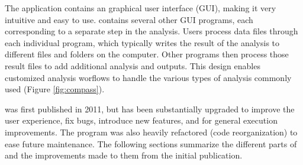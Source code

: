 The application contains an graphical user interface (GUI), making it very intuitive and easy to use. \compass{}  contains several other GUI programs, each corresponding to a separate step in the analysis. Users process data files through each individual program, which typically writes the result of the analysis to different files and folders on the computer. Other programs then process those result files to add additional analysis and outputs. This design enables customized analysis worflows to handle the various types of analysis commonly used (Figure \ref{fig:compass}).

\compass{} was first published in 2011, but has been substantially upgraded to improve the user experience, fix bugs, introduce new features, and for general execution improvements. The program was also heavily refactored (code reorganization) to ease future maintenance. The following sections summarize the different parts of \compass{} and the improvements made to them from the initial publication.
 
